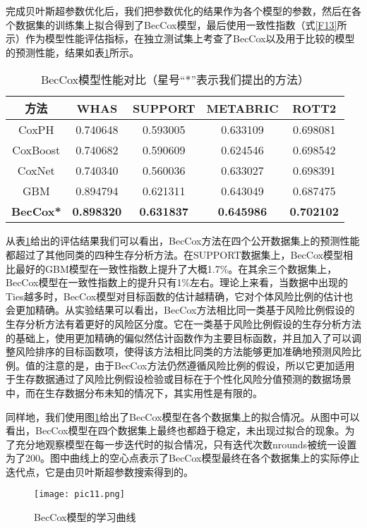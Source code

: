 完成贝叶斯超参数优化后，我们把参数优化的结果作为各个模型的参数，然后在各个数据集的训练集上拟合得到了BecCox模型，最后使用一致性指数（式\eqref{F13}所示）作为模型性能评估指标，在独立测试集上考查了BecCox以及用于比较的模型的预测性能，结果如表\ref{table05}所示。

\begin{table}[h]
\caption{BecCox模型性能对比（星号“*”表示我们提出的方法）}
\begin{tabular}{ccccc}
\toprule
方法 & WHAS & SUPPORT & METABRIC & ROTT2 \\ 
\midrule
CoxPH & 0.740648 & 0.593005 & 0.633109 & 0.698081 \\
CoxBoost & 0.740682 & 0.590609 & 0.624546 & 0.698542 \\
CoxNet & 0.740340 & 0.560036 & 0.633027 & 0.698391 \\
GBM & 0.894794 & 0.621311 & 0.643049 & 0.687475 \\
\textbf{BecCox*} & \textbf{0.898320} & \textbf{0.631837} & \textbf{0.645986} & \textbf{0.702102} \\
\bottomrule
\end{tabular}
\label{table05}
\end{table}

从表\ref{table05}给出的评估结果我们可以看出，BecCox方法在四个公开数据集上的预测性能都超过了其他同类的四种生存分析方法。在SUPPORT数据集上，BecCox模型相比最好的GBM模型在一致性指数上提升了大概1.7\%。在其余三个数据集上，BecCox模型在一致性指数上的提升只有1\%左右。理论上来看，当数据中出现的Ties越多时，BecCox模型对目标函数的估计越精确，它对个体风险比例的估计也会更加精确。从实验结果可以看出，BecCox方法相比同一类基于风险比例假设的生存分析方法有着更好的风险区分度。它在一类基于风险比例假设的生存分析方法的基础上，使用更加精确的偏似然估计函数作为主要目标函数，并且加入了可以调整风险排序的目标函数项，使得该方法相比同类的方法能够更加准确地预测风险比例。值的注意的是，由于BecCox方法仍然遵循风险比例的假设，所以它更加适用于生存数据通过了风险比例假设检验或目标在于个性化风险分值预测的数据场景中，而在生存数据分布未知的情况下，其实用性是有限的。

同样地，我们使用图\ref{pic11}给出了BecCox模型在各个数据集上的拟合情况。从图中可以看出，BecCox模型在四个数据集上最终也都趋于稳定，未出现过拟合的现象。为了充分地观察模型在每一步迭代时的拟合情况，只有迭代次数nrounds被统一设置为了200。图中曲线上的空心点表示了BecCox模型最终在各个数据集上的实际停止迭代点，它是由贝叶斯超参数搜索得到的。

\begin{figure}[H]
\texttt{[image: pic11.png]}
\caption{BecCox模型的学习曲线}
\label{pic11}
\end{figure}

